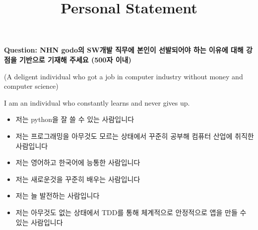\documentclass[12pt]{article}
\begin{document}
\title{Personal Statement}
\maketitle

\textbf{Question: NHN godo의 SW개발 직무에 본인이 선발되어야 하는 이유에 대해 강점을 기반으로 기재해 주세요 (500자 이내)}

\bigskip

(A deligent individual who got a job in computer industry without money and computer science)

I am an individual who constantly learns and never gives up.


\begin{itemize}
    \item 저는 python을 잘 쓸 수 있는 사람입니다
    \item 저는 프로그래밍을 아무것도 모르는 상태에서 꾸준히 공부해 컴퓨터 산업에 취직한 사람입니다
    \item 저는 영어하고 한국어에 능통한 사람입니다
    \item 저는 새로운것을 꾸준히 배우는 사람입니다
    \item 저는 늘 발전하는 사람입니다
    \item 저는 아무것도 없는 상태에서 TDD를 통해 체계적으로 안정적으로 앱을 만들 수 있는 사람입니다
\end{itemize}
\end{document}
